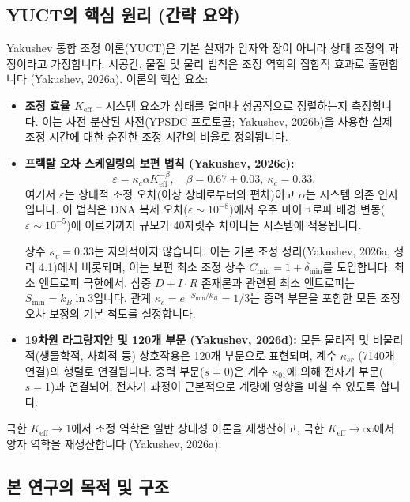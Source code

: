 \documentclass[11pt,a4paper]{article}
\newcommand{\Keff}{K_{\mathrm{eff}}}
\newcommand{\eps}{\varepsilon}
\newcommand{\kappac}{\kappa_c}
\newcommand{\constmin}{C_{\min}}
\newcommand{\dint}{\ensuremath{D\!+\!I\!\cdot\!R}}
\begin{document}
	\subsection{YUCT의 핵심 원리 (간략 요약)}
	\label{subsec:yuct-core}
	
	Yakushev 통합 조정 이론(YUCT)은 기본 실재가 입자와 장이 아니라 상태 조정의 과정이라고 가정합니다. 시공간, 물질 및 물리 법칙은 조정 역학의 집합적 효과로 출현합니다 (Yakushev, 2026a). 이론의 핵심 요소:
	\begin{itemize}
		\item \textbf{조정 효율 $\Keff$} – 시스템 요소가 상태를 얼마나 성공적으로 정렬하는지 측정합니다. 이는 사전 분산된 사전(YPSDC 프로토콜; Yakushev, 2026b)을 사용한 실제 조정 시간에 대한 순진한 조정 시간의 비율로 정의됩니다.
		\item \textbf{프랙탈 오차 스케일링의 보편 법칙 (Yakushev, 2026c):}
		\begin{equation}
			\eps = \kappac \alpha \Keff^{-\beta}, \quad \beta = 0.67 \pm 0.03, \ \kappac = 0.33,
			\label{eq:universal-scaling}
		\end{equation}
		여기서 $\eps$는 상대적 조정 오차(이상 상태로부터의 편차)이고 $\alpha$는 시스템 의존 인자입니다. 이 법칙은 DNA 복제 오차($\eps\sim 10^{-8}$)에서 우주 마이크로파 배경 변동($\eps\sim 10^{-5}$)에 이르기까지 규모가 40자릿수 차이나는 시스템에 적용됩니다.
		
		상수 $\kappac = 0.33$는 자의적이지 않습니다. 이는 기본 조정 정리(Yakushev, 2026a, 정리 4.1)에서 비롯되며, 이는 보편 최소 조정 상수 $\constmin = 1 + \delta_{\min}$를 도입합니다. 최소 엔트로피 극한에서, 삼중 $\dint$ 존재론과 관련된 최소 엔트로피는 $S_{\min} = k_B \ln 3$입니다. 관계 $\kappac = e^{-S_{\min}/k_B} = 1/3$는 중력 부문을 포함한 모든 조정 오차 보정의 기본 척도를 설정합니다.
		
		\item \textbf{19차원 라그랑지안 및 120개 부문 (Yakushev, 2026d):} 모든 물리적 및 비물리적(생물학적, 사회적 등) 상호작용은 120개 부문으로 표현되며, 계수 $\kappa_{sr}$ (7140개 연결)의 행렬로 연결됩니다. 중력 부문($s=0$)은 계수 $\kappa_{01}$에 의해 전자기 부문($s=1$)과 연결되어, 전자기 과정이 근본적으로 계량에 영향을 미칠 수 있도록 합니다.
	\end{itemize}
	극한 $\Keff \to 1$에서 조정 역학은 일반 상대성 이론을 재생산하고, 극한 $\Keff \to \infty$에서 양자 역학을 재생산합니다 (Yakushev, 2026a).
	
	\subsection{본 연구의 목적 및 구조}
	\label{subsec:purpose}
	
\end{document}
